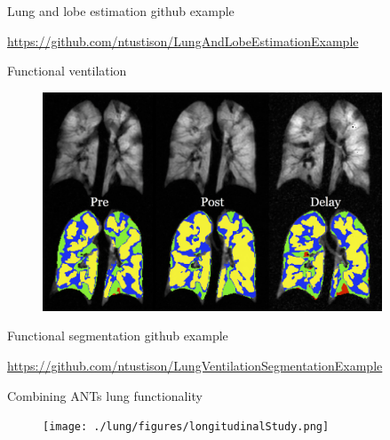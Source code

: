 \documentclass[ignorenonframetext,]{beamer}
\begin{document}
\begin{frame}{Lung and lobe estimation github example}

\url{https://github.com/ntustison/LungAndLobeEstimationExample}

\end{frame}

\begin{frame}{Functional ventilation}

\centering

\begin{figure}
\includegraphics[width=0.9\textwidth]{./lung/figures/prePostAlbuterol.png}
\end{figure}

\end{frame}

\begin{frame}{Functional segmentation github example}

\url{https://github.com/ntustison/LungVentilationSegmentationExample}

\end{frame}

\begin{frame}{Combining ANTs lung functionality}

\centering

\begin{figure}
\texttt{[image: ./lung/figures/longitudinalStudy.png]}
\end{figure}

\hypertarget{refs}{}

\end{frame}
\end{document}
